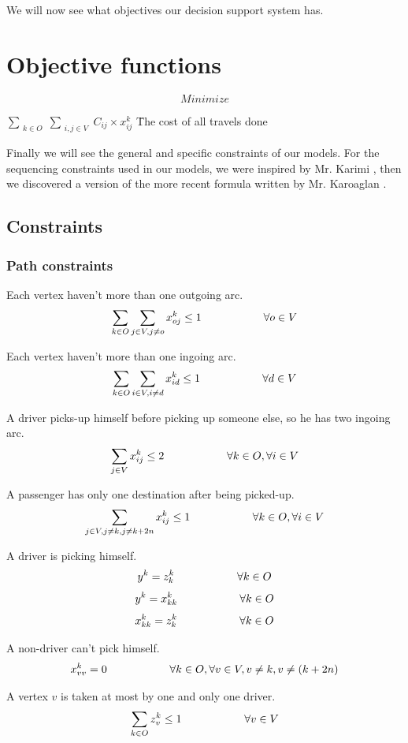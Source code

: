 \documentclass[12pt, a4paper,twoside]{memoir}
\newcommand\tab[1][1cm]{\hspace*{#1}}
\begin{document}
	We will now see what objectives our decision support system has. 
	
	\section{Objective functions}
	\[ Minimize \] 
	\begin{tabbing}
		$ \sum_{\substack{k\in O}}\sum_{\substack{i,j \in V}} C_{ij} \times x^{k}_{ij}$ \tab \tab \= The cost of all travels done \\
	\end{tabbing}
	
	Finally we will see the general and specific constraints of our models. For the sequencing constraints used in our models, we were inspired by Mr. Karimi \cite{karaoglanmemetic2015}, then we discovered a version of the more recent formula written by Mr. Karoaglan \cite{karimicapacitated2018}.
	
	\subsection{Constraints}
	\subsubsection{Path constraints}
	
	Each vertex haven't more than one outgoing arc.
	\[ \sum_{\substack{k\in O}}\sum_{\substack{j \in V,j\ne o}} x^{k}_{oj}\leq1 \tab \tab \forall o\in V \]
	
	Each vertex haven't more than one ingoing arc.
	\[ \sum_{\substack{k\in O}}\sum_{\substack{i \in V,i\ne d}} x^{k}_{id}\leq1 \tab \tab \forall d\in V \]
	
	A driver picks-up himself before picking up someone else, so he has two ingoing arc.
	\[ \sum_{\substack{j\in V}}x^{k}_{ij}\leq2\tab \tab \forall k\in O,\forall i\in V \]
	
	A passenger has only one destination after being picked-up.
	\[ \sum_{\substack{j\in V,j\ne k,j\ne k+2n}}x^{k}_{ij}\leq1\tab \tab \forall k\in O,\forall i\in V \]
	
	A driver is picking himself.
	\[ y^{k}=z^{k}_{k}\tab \tab \forall k\in O \]
	\[ y^{k}=x^{k}_{kk}\tab \tab \forall k\in O \]
	\[ x^{k}_{kk}=z^{k}_{k}\tab \tab \forall k\in O \]
	
	A non-driver can't pick himself.
	\[ x^{k}_{vv}=0 \tab \tab \forall k\in O,\forall v\in V,v\ne k,v\ne(k+2n)\]
	
	A vertex $v$ is taken at most by one and only one driver.
	\[ \sum_{\substack{k\in O}} z^{k}_{v}\leq1 \tab \tab \forall v\in V\]
	
\end{document}
